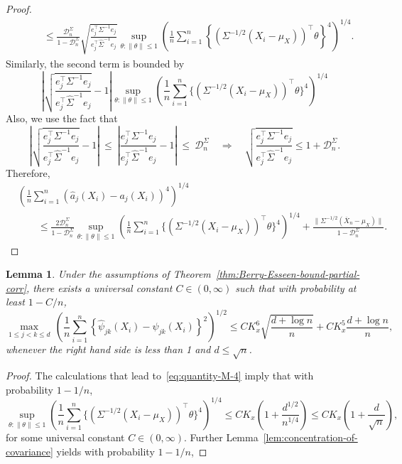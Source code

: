 \documentclass[11pt]{article}
\newtheorem{lemma}[theorem]{Lemma}
\begin{document}
\begin{appendices}
\begin{proof}
\begin{align*}
&\qquad\le \frac{\mathcal{D}_n^{\Sigma}}{1 - \mathcal{D}_n^{\Sigma}}\sqrt{\frac{e_j^{\top}\Sigma^{-1}e_j}{e_j^{\top}\widehat{\Sigma}^{-1}e_j}}\sup_{\theta:\|\theta\| \le 1}\left(\frac{1}{n}\sum_{i=1}^n \left\{(\Sigma^{-1/2}(X_i - \mu_X))^{\top}\theta\right\}^4\right)^{1/4}.
\end{align*}
Similarly, the second term is bounded by
\[
\left|\sqrt{\frac{e_j^{\top}\Sigma^{-1}e_j}{e_j^{\top}\widehat{\Sigma}^{-1}e_j}} - 1\right|\sup_{\theta:\|\theta\| \le 1}\left(\frac{1}{n}\sum_{i=1}^n {\{(\Sigma^{-1/2}(X_i - \mu_X))^{\top}\theta\}^4}\right)^{1/4}
\]
Also, we use the fact that
\[
\left|\sqrt{\frac{e_j^{\top}\Sigma^{-1}e_j}{e_j^{\top}\widehat{\Sigma}^{-1}e_j}} - 1\right| ~\le~ \left|{\frac{e_j^{\top}\Sigma^{-1}e_j}{e_j^{\top}\widehat{\Sigma}^{-1}e_j}} - 1\right| ~\le~ \mathcal{D}_n^{\Sigma}\quad\Rightarrow\quad \sqrt{\frac{e_j^{\top}\Sigma^{-1}e_j}{e_j^{\top}\widehat{\Sigma}^{-1}e_j}} \le 1 + \mathcal{D}_n^{\Sigma}.
\]
Therefore,
\begin{align*}
&\left(\frac{1}{n}\sum_{i=1}^n (\widehat{a}_j(X_i) - a_j(X_i))^4\right)^{1/4}\\ &\qquad\le \frac{2\mathcal{D}_n^{\Sigma}}{1 - \mathcal{D}_n^{\Sigma}}\sup_{\theta:\|\theta\| \le 1}\left(\frac{1}{n}\sum_{i=1}^n {\{(\Sigma^{-1/2}(X_i - \mu_X))^{\top}\theta\}^4}\right)^{1/4} + \frac{\|\Sigma^{-1/2}(\overline{X}_n - \mu_X)\|}{1 - \mathcal{D}_n^{\Sigma}}.
\end{align*}
\end{proof}
\begin{lemma}\label{lem:rate-of-convergence-psihat-minus-psi}
Under the assumptions of Theorem~\ref{thm:Berry-Esseen-bound-partial-corr}, there exists a universal constant $C\in(0,\infty)$ such that with probability at least $1 - C/n$,
\[
\max_{1\le j < k\le d}\,\left(\frac{1}{n}\sum_{i=1}^n \left\{\widehat{\psi}_{jk}(X_i) - \psi_{jk}(X_i)\right\}^2\right)^{1/2} \le CK_x^6\sqrt{\frac{d + \log n}{n}} + CK_x^5\frac{d + \log n}{n},
\]
whenever the right hand side is less than 1 and $d \le \sqrt{n}$. 
\end{lemma}
\begin{proof}
The calculations that lead to~\eqref{eq:quantity-M-4} imply that with probability $1 - 1/n$,
\[
\sup_{\theta:\|\theta\| \le 1}\left(\frac{1}{n}\sum_{i=1}^n {\{(\Sigma^{-1/2}(X_i - \mu_X))^{\top}\theta\}^4}\right)^{1/4} \le CK_x\left(1 + \frac{d^{1/2}}{n^{1/4}}\right) \le CK_x\left(1 + \frac{d}{\sqrt{n}}\right),
\]
for some universal constant $C\in(0, \infty)$. Further Lemma~\ref{lem:concentration-of-covariance} yields with probability $1 - 1/n$,

\end{proof}
\end{appendices}
\end{document}
